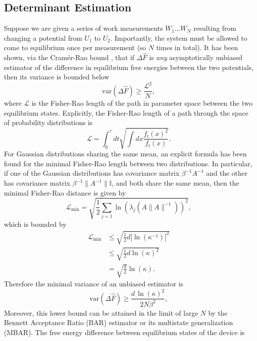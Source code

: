\documentclass[prx,onecolumn,floatfix,longbibliography,notitlepage, nofootinbib]{revtex4-1}
\renewcommand{\geq}{\geqslant}
\renewcommand{\leq}{\leqslant}
\begin{document}
\begin{appendix}
\section{Determinant Estimation}
Suppose we are given a series of work measurements $W_1 \dots W_N$ resulting from changing a potential from $U_1$ to $U_2$. Importantly, the system must be allowed to come to equilibrium once per measurement (so $N$ times in total). It has been shown, via the Cramér-Rao bound \cite{cramer1999mathematical}, that if $\Delta \hat{F}$ is \emph{any} asymptotically unbiased estimator of the difference in equilibrium free energies between the two potentials, then its variance is bounded below \cite{shenfeld2009minimizing}
\begin{equation}
    \text{var}\left(\Delta \hat{F} \right)\geq \frac{\mathcal{L}^2}{N},
\end{equation}
where $\mathcal{L}$ is the Fisher-Rao length of the path in parameter space between the two equilibrium states. Explicitly, the Fisher-Rao length of a path through the space of probability distributions is
\begin{equation}
    \mathcal{L} = \int_0^\tau dt \sqrt{\int dx \frac{\dot{f}_t(x)^2}{f_t(x)}}.
\end{equation}
For Gaussian distributions sharing the same mean, an explicit formula has been found for the minimal Fisher-Rao length between two distributions. In particular, if one of the Gaussian distributions has covariance matrix $\beta^{-1}A^{-1}$ and the other has covariance matrix $\beta^{-1} \|A^{-1}\|\mathbb{I}$, and both share the same mean, then the minimal Fisher-Rao distance is given by \cite{nielsen2023simple}
\begin{equation}
  \mathcal{L}_{\text{min}}  = \sqrt{\frac{1}{2} \sum_{j=1} \ln( \lambda_j(A\|A\|^{-1}))^2},
\end{equation}
which is bounded by
\begin{align}
  \mathcal{L}_{\text{min}} &\leq  \sqrt{\frac{1}{2} d \left|\ln( \kappa^{-1})\right|^2} \\
  &\leq  \sqrt{\frac{1}{2} d \ln( \kappa)^2} \\
  &=\sqrt{\frac{d}{2}}\ln(\kappa).
\end{align}
Therefore the minimal variance of an unbiased estimator is
\begin{equation}
    \text{var}\left(\Delta \hat{F} \right)\geq \frac{d\,\ln(\kappa)^2}{2N \beta^2},
\end{equation}
Moreover, this lower bound can be attained in the limit of large $N$ by the Bennett Acceptance Ratio (BAR) estimator or its multistate generalization (MBAR). The free energy difference between equilibrium states of the device is

\end{appendix}
\end{document}
